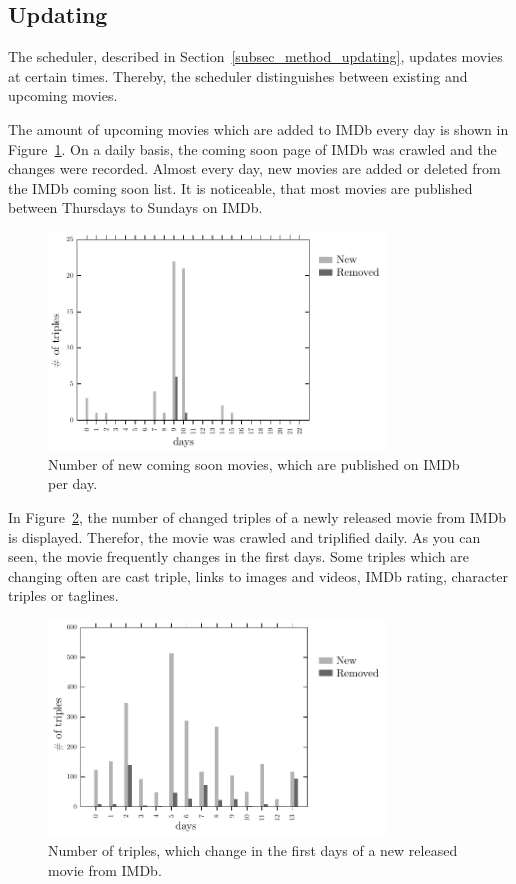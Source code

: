 \subsection{Updating}
\label{subsec_evaluation_updating}

The scheduler, described in Section~\ref{subsec_method_updating}, updates movies at certain times.
Thereby, the scheduler distinguishes between existing and upcoming movies.

The amount of upcoming movies which are added to IMDb every day is shown in Figure~\ref{fig_coming_soon_movie}.
On a daily basis, the coming soon page of IMDb was crawled and the changes were recorded.
Almost every day, new movies are added or deleted from the IMDb coming soon list.
It is noticeable, that most movies are published between Thursdays to Sundays on IMDb.

\begin{figure}[h!]
  \begin{center}
  \includegraphics[width=0.8\textwidth]{images/updating_1.pdf}
  \end{center}
  \caption{Number of new coming soon movies, which are published on IMDb per day.}
  \label{fig_coming_soon_movie}
\end{figure}

In Figure~\ref{fig_new_movie}, the number of changed triples of a newly released movie from IMDb is displayed.
Therefor, the movie was crawled and triplified daily.
As you can seen, the movie frequently changes in the first days.
Some triples which are changing often are cast triple, links to images and videos, IMDb rating, character triples or taglines.

\begin{figure}[h!]
  \begin{center}
  \includegraphics[width=0.8\textwidth]{images/updating_2.pdf}
  \end{center}
  \caption{Number of triples, which change in the first days of a new released movie from IMDb.}
  \label{fig_new_movie}
\end{figure}